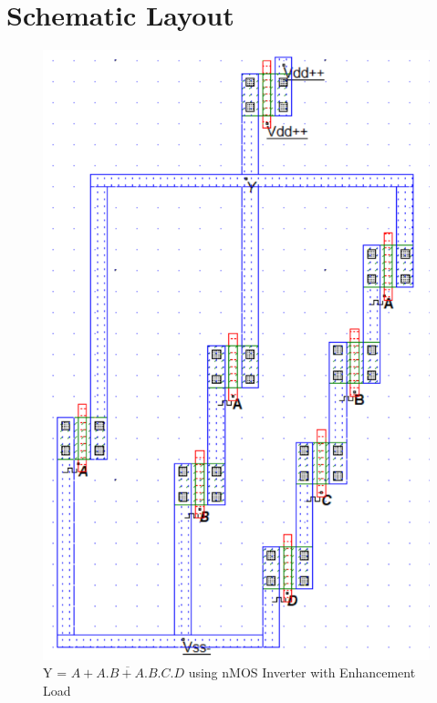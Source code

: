 \documentclass[a4paper,12pt]{article}
\begin{document}
	\section{Schematic Layout }
		\begin{figure}[H]
		\centering
		\includegraphics[width=0.9\linewidth]{Images/1}
		\caption{Y = $\overline{A + A . B + A . B . C . D}$ using nMOS Inverter with Enhancement Load}

		\label{fig:open}
	\end{figure}
\end{document}
